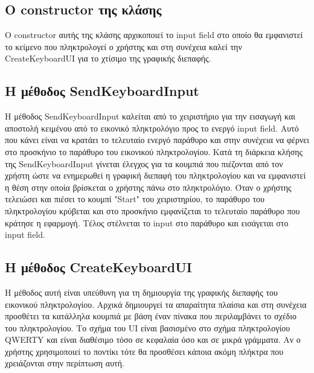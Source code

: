 \subsection{Ο constructor της κλάσης}
Ο constructor αυτής της κλάσης αρχικοποιεί το input field στο οποίο θα εμφανιστεί το κείμενο που
πληκτρολογεί ο χρήστης και στη συνέχεια καλεί την CreateKeyboardUI για το χτίσιμο της γραφικής
διεπαφής.



\subsection{Η μέθοδος SendKeyboardInput}
Η μέθοδος SendKeyboardInput καλείται από το χειριστήριο για την εισαγωγή και αποστολή κειμένου
από το εικονικό πληκτρολόγιο προς το ενεργό input field. Αυτό που κάνει είναι να κρατάει το
τελευταίο ενεργό παράθυρο και στην συνέχεια να φέρνει στο προσκήνιο το παράθυρο του εικονικού
πληκτρολογίου. Κατά τη διάρκεια κλήσης της SendKeyboardInput γίνεται έλεγχος για τα κουμπιά
που πιέζονται από τον χρήστη ώστε να ενημερωθεί η γραφική διεπαφή του πληκτρολογίου και να
εμφανιστεί η θέση στην οποία βρίσκεται ο χρήστης πάνω στο πληκτρολόγιο. Όταν ο χρήστης τελειώσει
και πιέσει το κουμπί "Start" του χειριστηρίου, το παράθυρο του πληκτρολογίου κρύβεται και στο
προσκήνιο εμφανίζεται το τελευταίο παράθυρο που κράτησε η εφαρμογή. Τέλος στέλνεται το input
στο παράθυρο και εισάγεται στο input field.



\subsection{Η μέθοδος CreateKeyboardUI}

Η μέθοδος αυτή είναι υπεύθυνη για τη δημιουργία της γραφικής διεπαφής του εικονικού πληκτρολογίου.
Αρχικά δημιουργεί τα απαραίτητα πλαίσια και στη συνέχεια προσθέτει τα κατάλληλα κουμπιά με βάση
έναν πίνακα που περιλαμβάνει το σχέδιο του πληκτρολογίου. Το σχήμα του UI είναι βασισμένο στο
σχήμα πληκτρολογίου QWERTY και είναι διαθέσιμο τόσο σε κεφαλαία όσο και σε μικρά γράμματα. Αν
ο χρήστης χρησιμοποιεί το ποντίκι τότε θα προσθέσει κάποια ακόμη πλήκτρα που χρειάζονται στην
περίπτωση αυτή.



